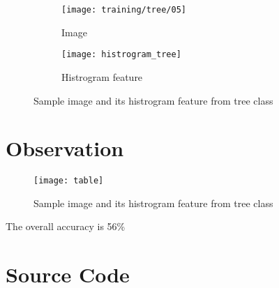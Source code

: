 \documentclass[11pt]{article}
\begin{document}
\begin{figure}[H]
\begin{subfigure}{1\textwidth}
  \centering
  \texttt{[image: training/tree/05]}
  \caption{Image}
  \label{}
\end{subfigure}
\begin{subfigure}{1\textwidth}
  \centering
  \texttt{[image: histrogram\_tree]}
  \caption{Histrogram feature}
  \label{}
\end{subfigure}

\caption{Sample image and its histrogram feature from tree class}
\label{}
\end{figure}



\section*{Observation}

\begin{figure}[H]
\centering
\texttt{[image: table]}
\caption{Sample image and its histrogram feature from tree class}
\label{}
\end{figure}

The overall accuracy is 56\%


\section*{Source Code}
\end{document}
